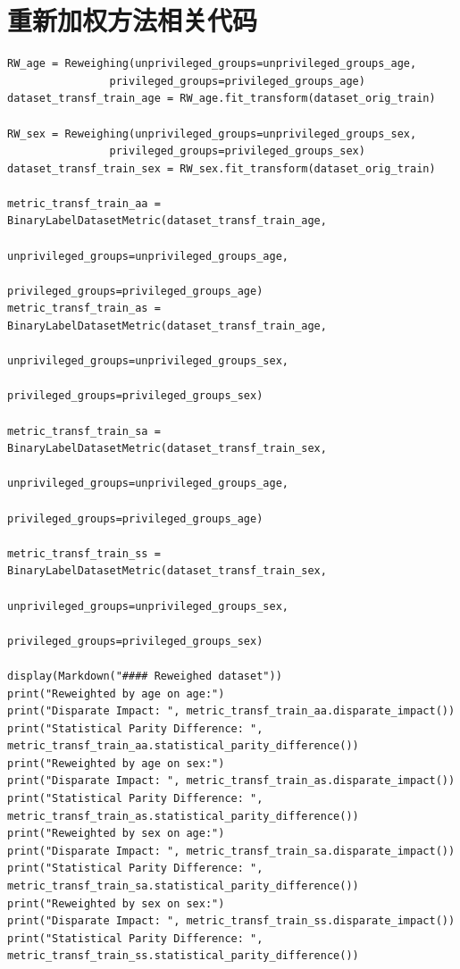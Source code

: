 \documentclass{article}
\begin{document}
\section{重新加权方法相关代码}
\begin{lstlisting}
RW_age = Reweighing(unprivileged_groups=unprivileged_groups_age,
                privileged_groups=privileged_groups_age)
dataset_transf_train_age = RW_age.fit_transform(dataset_orig_train)

RW_sex = Reweighing(unprivileged_groups=unprivileged_groups_sex,
                privileged_groups=privileged_groups_sex)
dataset_transf_train_sex = RW_sex.fit_transform(dataset_orig_train)

metric_transf_train_aa = BinaryLabelDatasetMetric(dataset_transf_train_age, 
                                               unprivileged_groups=unprivileged_groups_age,
                                               privileged_groups=privileged_groups_age)
metric_transf_train_as = BinaryLabelDatasetMetric(dataset_transf_train_age, 
                                               unprivileged_groups=unprivileged_groups_sex,
                                               privileged_groups=privileged_groups_sex)

metric_transf_train_sa = BinaryLabelDatasetMetric(dataset_transf_train_sex, 
                                               unprivileged_groups=unprivileged_groups_age,
                                               privileged_groups=privileged_groups_age)

metric_transf_train_ss = BinaryLabelDatasetMetric(dataset_transf_train_sex, 
                                               unprivileged_groups=unprivileged_groups_sex,
                                               privileged_groups=privileged_groups_sex)

display(Markdown("#### Reweighed dataset"))
print("Reweighted by age on age:")
print("Disparate Impact: ", metric_transf_train_aa.disparate_impact())
print("Statistical Parity Difference: ", metric_transf_train_aa.statistical_parity_difference())
print("Reweighted by age on sex:")
print("Disparate Impact: ", metric_transf_train_as.disparate_impact())
print("Statistical Parity Difference: ", metric_transf_train_as.statistical_parity_difference())
print("Reweighted by sex on age:")
print("Disparate Impact: ", metric_transf_train_sa.disparate_impact())
print("Statistical Parity Difference: ", metric_transf_train_sa.statistical_parity_difference())
print("Reweighted by sex on sex:")
print("Disparate Impact: ", metric_transf_train_ss.disparate_impact())
print("Statistical Parity Difference: ", metric_transf_train_ss.statistical_parity_difference())
\end{lstlisting}
\end{document}
